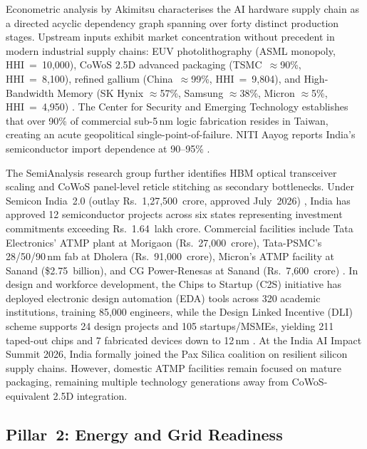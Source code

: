 \documentclass[conference]{IEEEtran}
\begin{document}
Econometric analysis by Akimitsu \cite{akimitsu2026chokepoints} characterises the AI hardware supply chain as a directed acyclic dependency graph spanning over forty distinct production stages. Upstream inputs exhibit market concentration without precedent in modern industrial supply chains: EUV photolithography (ASML monopoly, HHI~=~10{,}000), CoWoS 2.5D advanced packaging (TSMC~$\approx$90\%, HHI~=~8{,}100), refined gallium (China~$\approx$99\%, HHI~=~9{,}804), and High-Bandwidth Memory (SK Hynix $\approx$57\%, Samsung $\approx$38\%, Micron $\approx$5\%, HHI~=~4{,}950) \cite{counterpoint2025hbm,akimitsu2026chokepoints}. The Center for Security and Emerging Technology \cite{cset2024compute} establishes that over 90\% of commercial sub-5\,nm logic fabrication resides in Taiwan, creating an acute geopolitical single-point-of-failure. NITI Aayog reports India's semiconductor import dependence at 90--95\% \cite{niti2026semiconductor}.

The SemiAnalysis research group \cite{semianalysis2025chokepoints} further identifies HBM optical transceiver scaling and CoWoS panel-level reticle stitching as secondary bottlenecks. Under Semicon India~2.0 (outlay Rs.~1{,}27{,}500~crore, approved July~2026) \cite{pib2026semicon2}, India has approved 12 semiconductor projects across six states representing investment commitments exceeding Rs.~1.64~lakh crore. Commercial facilities include Tata Electronics' ATMP plant at Morigaon (Rs.~27{,}000~crore), Tata-PSMC's 28/50/90\,nm fab at Dholera (Rs.~91{,}000~crore), Micron's ATMP facility at Sanand (\$2.75~billion), and CG Power-Renesas at Sanand (Rs.~7{,}600~crore) \cite{ism2025semicon,pib2026semicon2}. In design and workforce development, the Chips to Startup (C2S) initiative has deployed electronic design automation (EDA) tools across 320 academic institutions, training 85{,}000 engineers, while the Design Linked Incentive (DLI) scheme supports 24 design projects and 105 startups/MSMEs, yielding 211 taped-out chips and 7 fabricated devices down to 12\,nm \cite{niti2026semiconductor}. At the India AI Impact Summit 2026, India formally joined the Pax Silica coalition on resilient silicon supply chains. However, domestic ATMP facilities remain focused on mature packaging, remaining multiple technology generations away from CoWoS-equivalent 2.5D integration.

\subsection{Pillar~2: Energy and Grid Readiness}
\end{document}
